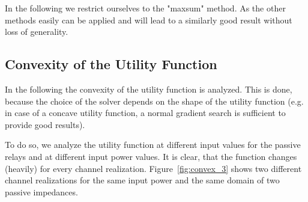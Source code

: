 In the following we restrict ourselves to the "maxsum" method.
As the other methods easily can be applied and will lead to a similarly good result without loss of generality.

\subsection{Convexity of the Utility Function}
\label{sec:}

In the following the convexity of the utility function is analyzed.
This is done, because the choice of the solver depends on the shape of the utility function (e.g. in case of a concave utility function, a normal gradient search is sufficient to provide good results).

To do so, we analyze the utility function at different input values for the passive relays and at different input power values.
It is clear, that the function changes (heavily) for every channel realization.
Figure~\ref{fig:convex_3} shows two different channel realizations for the same input power and the same domain of two passive impedances.

